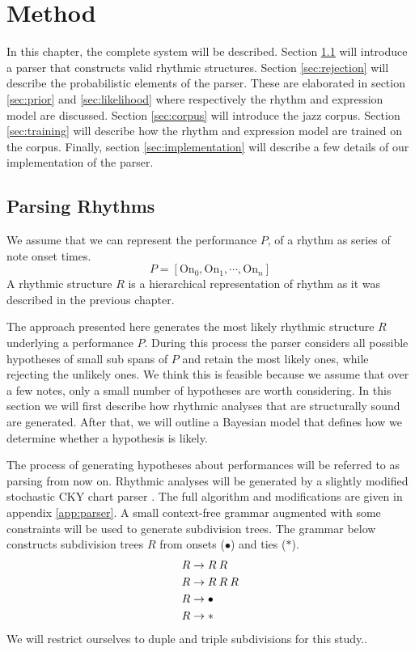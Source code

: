 \chapter{Method}
\label{sec:method}

In this chapter, the complete system will be described. Section \ref{sec:parser} will introduce a parser that constructs valid rhythmic structures. Section \ref{sec:rejection} will describe the probabilistic elements of the parser. These are elaborated in section \ref{sec:prior} and \ref{sec:likelihood} where respectively the rhythm and expression model are discussed. Section \ref{sec:corpus} will introduce the jazz corpus. Section \ref{sec:training} will describe how the rhythm and expression model are trained on the corpus. Finally, section \ref{sec:implementation} will describe a few details of our implementation of the parser.

\section{Parsing Rhythms}
\label{sec:parser}

We assume that we can represent the performance $P$, of a rhythm as series of note onset times. 
\begin{equation}
\label{eq:performance}
P = [\mathrm{On}_0, \mathrm{On}_1, \cdots, \mathrm{On}_n]
\end{equation}
A rhythmic structure $R$ is a hierarchical representation of rhythm as it was described in the previous chapter.

The approach presented here generates the most likely rhythmic structure $R$ underlying a performance $P$. During this process the parser considers all possible hypotheses of small sub spans of $P$ and retain the most likely ones, while rejecting the unlikely ones. We think this is feasible because we assume that over a few notes, only a small number of hypotheses are worth considering. In this section we will first describe how rhythmic analyses that are structurally sound are generated. After that, we will outline a Bayesian model that defines how we determine whether a hypothesis is likely.

The process of generating hypotheses about performances will be referred to as parsing from now on. Rhythmic analyses will be generated by a slightly modified stochastic CKY chart parser \citep{Younger1967recognition}. The full algorithm and modifications are given in appendix \ref{app:parser}. A small context-free grammar augmented with some constraints will be used to generate subdivision trees. The grammar below constructs subdivision trees $R$ from onsets ($\bullet$) and ties ($*$).
\begin{align}
R &\rightarrow R\: R\\ \notag
R &\rightarrow R\: R\: R\\ \notag
R &\rightarrow \bullet\\ \notag
R &\rightarrow * \notag
\end{align}
We will restrict ourselves to duple and triple subdivisions for this study..

